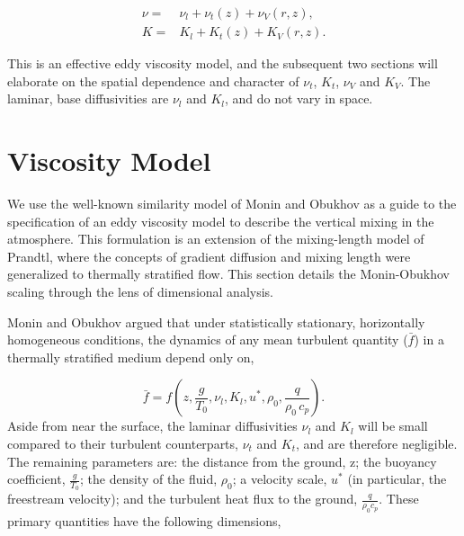 \begin{eqnarray}
 \nu =& \nu_{l} + \nu_{t}(z) + \nu_{V}(r,z), \label{eqn:visc_tot}\\
 K =& K_{l} + K_{t}(z) + K_{V}(r,z). \label{eqn:therm_tot}
\end{eqnarray}

This is an effective eddy viscosity model\cite{boussinesq1887}, and the
subsequent two sections will elaborate on the spatial dependence and
character of $\nu_t$, $K_t$, $\nu_V$ and $K_V$. The laminar, base
diffusivities are $\nu_l$ and $K_l$, and do not vary in space.  

\section{Viscosity Model}

We use the well-known similarity model of Monin and
Obukhov\cite{monin2007statistical,1990JFM...212..637K} as
a guide to the specification of an eddy viscosity model to describe the
vertical mixing in the atmosphere.
This formulation is an extension of
the mixing-length model of Prandtl, where the concepts of gradient
diffusion and mixing length were generalized to thermally stratified
flow. This section details the Monin-Obukhov scaling through the lens 
of dimensional analysis. 

%
%

Monin and Obukhov argued that under statistically stationary, horizontally
homogeneous conditions, the dynamics of any mean turbulent quantity
($\bar f$) in a thermally stratified medium depend only on,  

\begin{equation}
\bar f = f(z,\frac{g}{T_0},\nu_l,K_l,u^*,\rho_0,\frac{q}{\rho_0 \, c_p}).
\end{equation}
Aside from near the surface, the laminar diffusivities $\nu_l$ 
and $K_l$ will be  
small compared to their turbulent counterparts, $\nu_t$ and $K_t$, and 
are therefore negligible. 
The remaining parameters are: the distance from the ground, z; the
buoyancy coefficient, $\frac{g}{T_0}$; 
the density of the fluid, $\rho_0$; 
a velocity scale, $u^*$ (in particular, the freestream
velocity); and the turbulent heat flux to the ground, $\frac{q}{\rho_0 c_p}$. 
%
% 
These primary quantities have the following dimensions,

